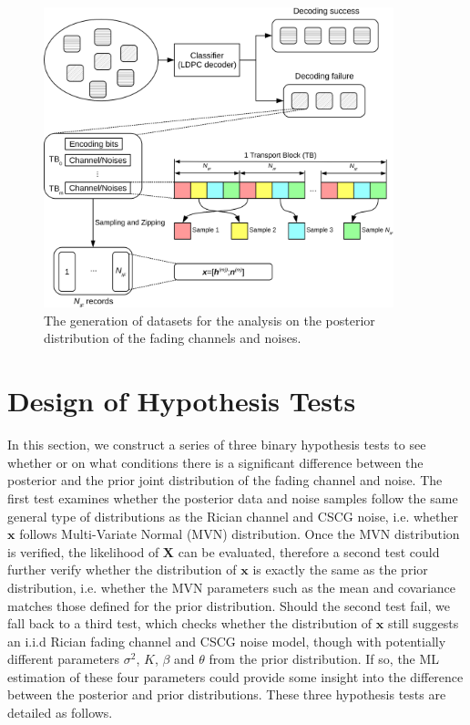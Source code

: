 \documentclass[journal,draftcls,onecolumn,12pt,twoside]{IEEEtran}
\begin{document}
\begin{figure}[!t]
  \centering
  \includegraphics[width=4.0in]{./figs/data.eps}
  \caption{The generation of datasets for the analysis on the posterior
  distribution of the fading channels and noises.}
  \label{fig:model}
\end{figure}

\section{Design of Hypothesis Tests}
\label{sec:tests}
In this section, we construct a series of three binary hypothesis tests to see
whether or on what conditions there is a significant difference between the
posterior and the prior joint distribution of the fading channel and noise.
The first test examines whether the posterior data and noise samples follow the same
general type of distributions as the Rician channel and CSCG noise, i.e. whether
$\mathbf{x}$ follows Multi-Variate Normal (MVN) distribution. Once the MVN
distribution is verified, the likelihood of $\mathbf{X}$ can be evaluated,
therefore a second test could further verify whether the distribution of
$\mathbf{x}$ is exactly the same as the prior distribution, i.e. whether the MVN
parameters such as the mean and covariance matches those defined for the prior
distribution. Should the second test fail, we fall back to a third test, which
checks whether the distribution of $\mathbf{x}$ still suggests an i.i.d Rician
fading channel and CSCG noise model, though with potentially different parameters
$\sigma^2$, $K$, $\beta$ and $\theta$ from the prior distribution. If so, the ML estimation of these four parameters could provide some insight into the difference between the
posterior and prior distributions. These three hypothesis tests are detailed as
follows.
\end{document}
